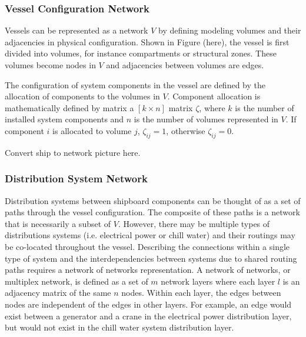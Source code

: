 \documentclass[preprint,12pt]{elsarticle}
\begin{document}
\subsubsection{Vessel Configuration Network} \label{sec:vesselmodel}
Vessels can be represented as a network $V$ by defining modeling volumes and their adjacencies in physical configuration. Shown in Figure (here), the vessel is first divided into volumes, for instance compartments or structural zones. These volumes become nodes in $V$ and adjacencies between volumes are edges. 

The configuration of system components in the vessel are defined by the allocation of components to the volumes in $V$. Component allocation is mathematically defined by matrix a $[k \times n]$ matrix $\zeta$, where $k$ is the number of installed system components and $n$ is the number of volumes represented in $V$. If component $i$ is allocated to volume $j$, $\zeta_{ij}=1$, otherwise $\zeta_{ij}=0$.   

Convert ship to network picture here.

 

\subsubsection{Distribution System Network} \label{sec:sysmodel}
Distribution systems between shipboard components can be thought of as a set of paths through the vessel configuration. The composite of these paths is a network that is necessarily a subset of $V$. However, there may be multiple types of distributions systems (i.e. electrical power or chill water) and their routings may be co-located throughout the vessel. Describing the connections within a single type of system and the interdependencies between systems due to shared routing paths requires a network of networks representation. A network of networks, or multiplex network, is defined as a set of $m$ network layers where each layer $l$ is an adjacency matrix of the same $n$ nodes. Within each layer, the edges between nodes are independent of the edges in other layers. For example, an edge would exist between a generator and a crane in the electrical power distribution layer, but would not exist in the chill water system distribution layer. 
\end{document}

